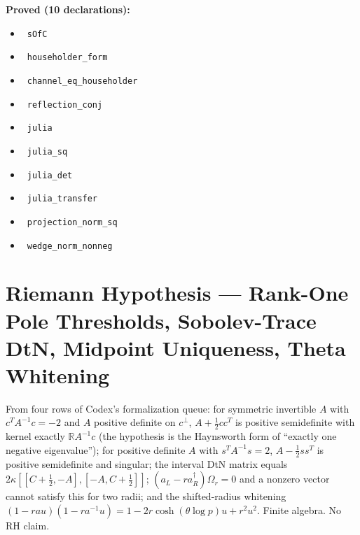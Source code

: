 \documentclass{report}
\theoremstyle{definition}
\begin{document}
\noindent\textbf{Proved (10 declarations):}
\begin{itemize}
  \item {}\leanok\ \texttt{sOfC}
  \item {}\leanok\ \texttt{householder\_form}
  \item {}\leanok\ \texttt{channel\_eq\_householder}
  \item {}\leanok\ \texttt{reflection\_conj}
  \item {}\leanok\ \texttt{julia}
  \item {}\leanok\ \texttt{julia\_sq}
  \item {}\leanok\ \texttt{julia\_det}
  \item {}\leanok\ \texttt{julia\_transfer}
  \item {}\leanok\ \texttt{projection\_norm\_sq}
  \item {}\leanok\ \texttt{wedge\_norm\_nonneg}
\end{itemize}

\section{Riemann Hypothesis --- Rank-One Pole Thresholds, Sobolev-Trace DtN, Midpoint Uniqueness, Theta Whitening}
From four rows of Codex's formalization queue: for symmetric invertible $A$ with $c^TA^{-1}c=-2$ and $A$ positive definite on $c^\perp$, $A+\tfrac12cc^T$ is positive semidefinite with kernel exactly $\mathbb RA^{-1}c$ (the hypothesis is the Haynsworth form of ``exactly one negative eigenvalue''); for positive definite $A$ with $s^TA^{-1}s=2$, $A-\tfrac12ss^T$ is positive semidefinite and singular; the interval DtN matrix equals $2\kappa[[C+\tfrac12,-A],[-A,C+\tfrac12]]$; $(a_L-ra_R^\dagger)\Omega_r=0$ and a nonzero vector cannot satisfy this for two radii; and the shifted-radius whitening $(1-rau)(1-ra^{-1}u)=1-2r\cosh(\theta\log p)u+r^2u^2$. Finite algebra. No RH claim.
\end{document}
